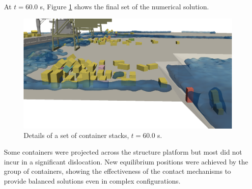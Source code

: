 At $t=60.0$ s, Figure \ref{fig:cont_t300} shows the final set of the numerical solution. 
%
\begin{figure}[H]
	\centering
	\includegraphics[width=0.95\linewidth]{Figures/6.Chapter/cont_t300} 
	\caption{Details of a set of container stacks, $t=60.0$ s.}
	\label{fig:cont_t300} 
\end{figure}
%
Some containers were projected across the structure platform but most did not incur in a significant dislocation. New equilibrium positions were achieved by the group of containers, showing the effectiveness of the contact mechanisms to provide balanced solutions even in complex configurations.

